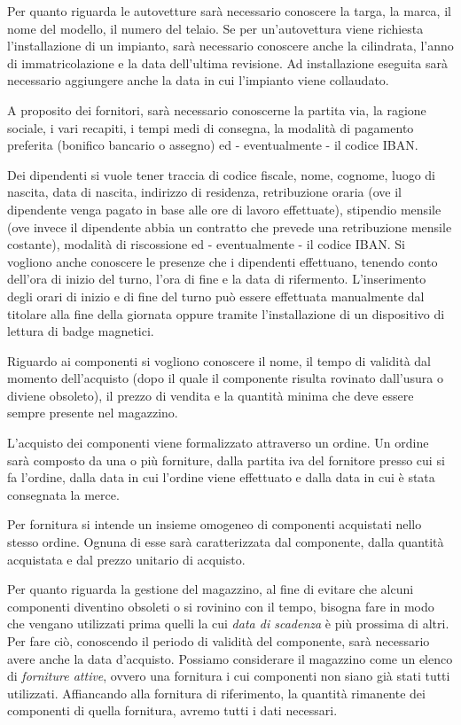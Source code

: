 		Per quanto riguarda le autovetture sarà necessario conoscere la targa, la marca, il nome del modello, il numero del telaio. Se per un’autovettura viene richiesta l’installazione di un impianto, sarà necessario conoscere anche la cilindrata, l’anno di immatricolazione e la data dell’ultima revisione. Ad installazione eseguita sarà necessario aggiungere anche la data in cui l'impianto viene collaudato.
		
		A proposito dei fornitori, sarà necessario conoscerne la partita via, la ragione sociale, i vari recapiti, i tempi medi di consegna, la modalità di pagamento preferita (bonifico bancario o assegno) ed - eventualmente - il codice IBAN.
		
		Dei dipendenti si vuole tener traccia di codice fiscale, nome, cognome, luogo di nascita, data di nascita, indirizzo di residenza, retribuzione oraria (ove il dipendente venga pagato in base alle ore di lavoro effettuate), stipendio mensile (ove invece il dipendente abbia un contratto che prevede una retribuzione mensile costante), modalità di riscossione ed - eventualmente - il codice IBAN. Si vogliono anche conoscere le presenze che i dipendenti effettuano, tenendo conto dell’ora di inizio del turno, l’ora di fine e la data di rifermento. 
		L'inserimento degli orari di inizio e di fine del turno può essere effettuata manualmente dal titolare alla fine della giornata oppure tramite l'installazione di un dispositivo di lettura di badge magnetici.
		
		Riguardo ai componenti si vogliono conoscere il nome, il tempo di validità dal momento dell'acquisto (dopo il quale il componente risulta rovinato dall'usura o diviene obsoleto), il prezzo di vendita e la quantità minima che deve essere sempre presente nel magazzino.
		
		L'acquisto dei componenti viene formalizzato attraverso un ordine. Un ordine sarà composto da una o più forniture, dalla partita iva del fornitore presso cui si fa l'ordine, dalla data in cui l'ordine viene effettuato e dalla data in cui è stata consegnata la merce.
		
		Per fornitura si intende un insieme omogeneo di componenti acquistati nello stesso ordine. Ognuna di esse sarà caratterizzata dal componente, dalla quantità acquistata e dal prezzo unitario di acquisto.
		
		Per quanto riguarda la gestione del magazzino, al fine di evitare che alcuni componenti diventino obsoleti o si rovinino con il tempo, bisogna fare in modo che vengano utilizzati prima quelli la cui \emph{data di scadenza} è più prossima di altri. Per fare ciò, conoscendo il periodo di validità del componente, sarà necessario avere anche la data d'acquisto.
		Possiamo considerare il magazzino come un elenco di \emph{forniture attive}, ovvero una fornitura i cui componenti non siano già stati tutti utilizzati. Affiancando alla fornitura di riferimento, la quantità rimanente dei componenti di quella fornitura, avremo tutti i dati necessari.
		

